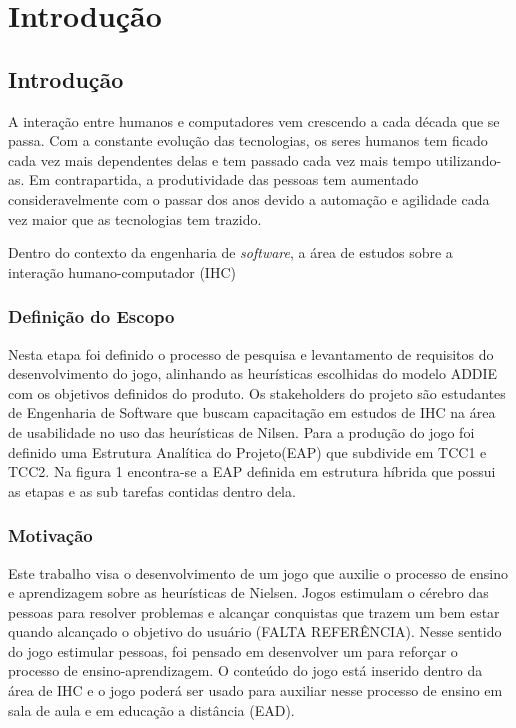 \part{Introdução}

\chapter[Introdução]{Introdução}

A interação entre humanos e computadores vem crescendo a cada década que se passa. Com a constante evolução das tecnologias, os seres humanos tem ficado cada vez mais dependentes delas e tem passado cada vez mais tempo utilizando-as. Em contrapartida, a produtividade das pessoas tem aumentado consideravelmente com o passar dos anos devido a automação e agilidade cada vez maior que as tecnologias tem trazido. \cite{prado2006arquitetura}

Dentro do contexto da engenharia de \textit{software}, a área de estudos sobre a interação humano-computador (IHC)

\section{Definição do Escopo}

Nesta etapa foi definido o processo de pesquisa e levantamento de requisitos do desenvolvimento do jogo, alinhando as heurísticas  escolhidas do modelo ADDIE com os objetivos definidos do produto.
Os stakeholders do projeto são estudantes de Engenharia de Software que buscam capacitação em estudos de IHC na área de usabilidade no uso das heurísticas de Nilsen. 
Para a produção do jogo foi definido uma Estrutura Analítica do Projeto(EAP) que subdivide em TCC1 e TCC2. Na figura 1 encontra-se a EAP definida em estrutura híbrida que possui as etapas e as sub tarefas contidas dentro dela. \cite{boletimdogerenciamento}


\section{Motivação}

Este trabalho visa o desenvolvimento de um jogo que auxilie o processo de ensino e aprendizagem sobre as heurísticas de Nielsen. Jogos estimulam o cérebro das pessoas para resolver problemas e alcançar conquistas que trazem um bem estar quando alcançado o objetivo do usuário (FALTA REFERÊNCIA). Nesse sentido do jogo estimular pessoas, foi pensado em desenvolver um para reforçar o processo de ensino-aprendizagem. O conteúdo do jogo está inserido dentro da área de IHC e o jogo poderá ser usado para auxiliar nesse processo de ensino em sala de aula e em educação a distância (EAD).

